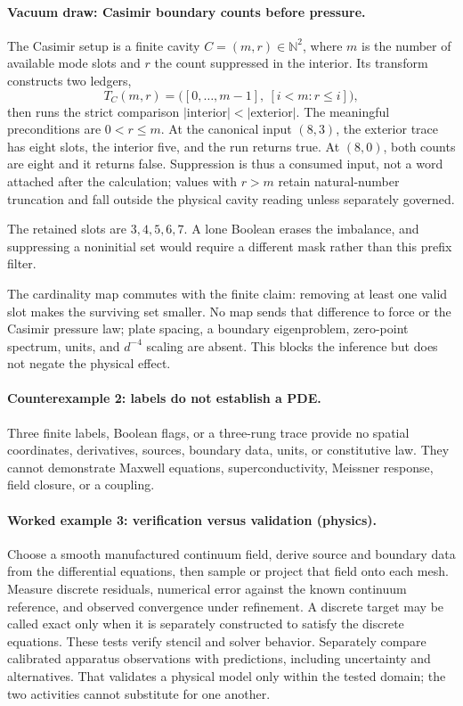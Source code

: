 \paragraph{Vacuum draw: Casimir boundary counts before pressure.}
The Casimir setup is a finite cavity \(C=(m,r)\in\mathbb N^2\), where \(m\) is the number of available mode slots and
\(r\) the count suppressed in the interior.  Its transform constructs two ledgers,
\[
 T_C(m,r)=\bigl([0,\ldots,m-1],\ [i<m:r\le i]\bigr),
\]
then runs the strict comparison \(|\mathrm{interior}|<|\mathrm{exterior}|\).  The meaningful preconditions are
\(0<r\le m\).  At the canonical input \((8,3)\), the exterior trace has eight slots, the interior five, and the run
returns true.  At \((8,0)\), both counts are eight and it returns false.  Suppression is thus a consumed input, not a
word attached after the calculation; values with \(r>m\) retain natural-number truncation and fall outside the
physical cavity reading unless separately governed.

The retained slots are \(3,4,5,6,7\).  A lone Boolean erases the imbalance, and suppressing a noninitial set would
require a different mask rather than this prefix filter.

The cardinality map commutes with the finite claim: removing at least one valid slot makes the surviving set smaller.
No map sends that difference to force or the Casimir pressure law; plate spacing, a boundary eigenproblem, zero-point
spectrum, units, and \(d^{-4}\) scaling are absent.  This blocks the inference but does not negate the physical effect.

\paragraph{Counterexample 2: labels do not establish a PDE.}
Three finite labels, Boolean flags, or a three-rung trace provide no spatial coordinates, derivatives, sources,
boundary data, units, or constitutive law.  They cannot demonstrate Maxwell equations, superconductivity, Meissner
response, field closure, or a coupling.

\paragraph{Worked example 3: verification versus validation (physics).}
Choose a smooth manufactured continuum field, derive source and boundary data from the differential equations, then
sample or project that field onto each mesh.  Measure discrete residuals, numerical error against the known continuum
reference, and observed convergence under refinement.  A discrete target may be called exact only when it is
separately constructed to satisfy the discrete equations.  These tests verify stencil and solver behavior.  Separately
compare calibrated apparatus observations with predictions, including uncertainty and alternatives.  That validates a
physical model only within the tested domain; the two activities cannot substitute for one another.


